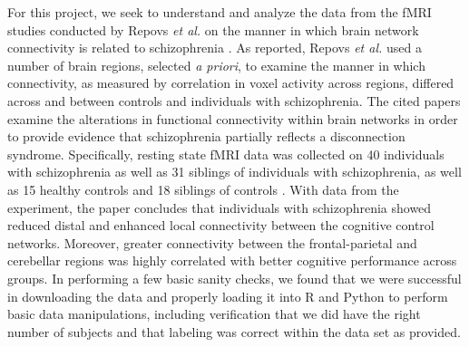 \documentclass[11pt]{article}
\begin{document}
For this project, we seek to understand and analyze the data from the fMRI 
studies conducted by Repovs \textit{et al.} on the manner in which brain 
network connectivity is related to schizophrenia \cite{repovs2011,repovs2012}.
As reported, Repovs \textit{et al.} used a number of brain regions, selected
\textit{a priori}, to examine the manner in which connectivity, as measured 
by correlation in voxel activity across regions, differed across and between 
controls and individuals with schizophrenia. The cited papers examine the 
alterations in functional connectivity within brain networks in order to 
provide evidence that schizophrenia partially reflects a disconnection 
syndrome. Specifically, resting state fMRI data was collected on 40 
individuals with schizophrenia as well as 31 siblings of individuals with 
schizophrenia, as well as 15 healthy controls and 18 siblings of controls
\cite{repovs2011}. With data from the experiment, the paper concludes that 
individuals with schizophrenia showed reduced distal and enhanced local 
connectivity between the cognitive control networks. Moreover, greater 
connectivity between the frontal-parietal and cerebellar regions was highly
correlated with better cognitive performance across groups. In performing a few
basic sanity checks, we found that we were successful in downloading the data 
and properly loading it into R and Python to perform basic data manipulations,
including verification that we did have the right number of subjects and that 
labeling was correct within the data set as provided.
\end{document}
